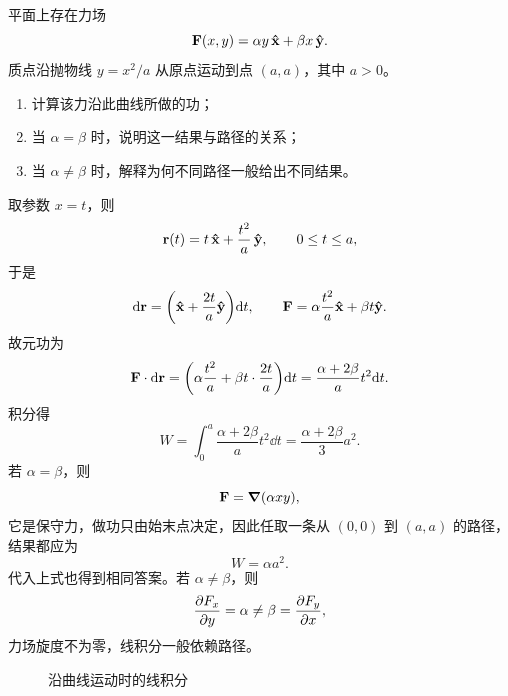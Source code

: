 \begin{competition}
平面上存在力场
\[
\vb{F}(x,y)=\alpha y\,\vu{x}+\beta x\,\vu{y}.
\]
质点沿抛物线 $y=x^2/a$ 从原点运动到点 $(a,a)$，其中 $a>0$。
\begin{enumerate}
  \item 计算该力沿此曲线所做的功；
  \item 当 $\alpha=\beta$ 时，说明这一结果与路径的关系；
  \item 当 $\alpha\ne\beta$ 时，解释为何不同路径一般给出不同结果。
\end{enumerate}
\begin{solution}
取参数 $x=t$，则
\[
\vb{r}(t)=t\,\vu{x}+\frac{t^2}{a}\,\vu{y},
\qquad 0\le t\le a,
\]
于是
\[
\dd \vb{r}=\qty(\vu{x}+\frac{2t}{a}\vu{y})\dd t,
\qquad
\vb{F}=\alpha\frac{t^2}{a}\vu{x}+\beta t\vu{y}.
\]
故元功为
\[
\vb{F}\cdot \dd \vb{r}=\qty(\alpha\frac{t^2}{a}+\beta t\cdot \frac{2t}{a})\dd t=\frac{\alpha+2\beta}{a}t^2\dd t.
\]
积分得
\[
W=\int_0^a \frac{\alpha+2\beta}{a}t^2\dd t=\frac{\alpha+2\beta}{3}a^2.
\]
若 $\alpha=\beta$，则
\[
\vb{F}=\grad(\alpha xy),
\]
它是保守力，做功只由始末点决定，因此任取一条从 $(0,0)$ 到 $(a,a)$ 的路径，结果都应为
\[
W=\alpha a^2.
\]
代入上式也得到相同答案。若 $\alpha\ne\beta$，则
\[
\pdv{F_x}{y}=\alpha\ne \beta=\pdv{F_y}{x},
\]
力场旋度不为零，线积分一般依赖路径。

\begin{figure}[H]
\centering
{}
\caption{沿曲线运动时的线积分}
\end{figure}
\end{solution}
\end{competition}


